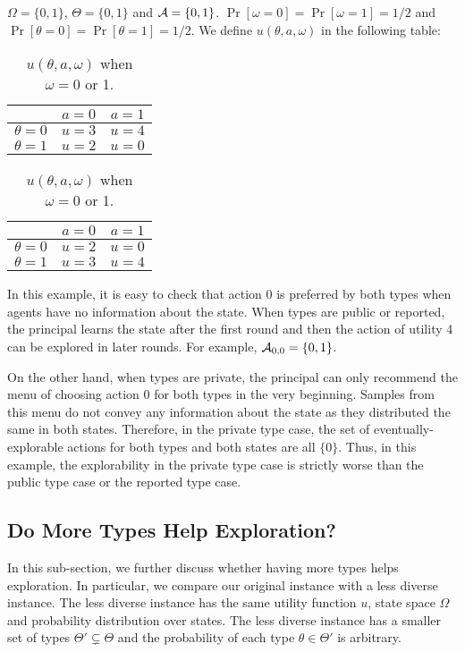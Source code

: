\begin{example}
\label{exp:simple}
$\varOmega = \{0,1\}$, $\varTheta = \{0,1\}$ and $\mathcal{A} =\{0,1\}$. $\Pr[\omega =0] =\Pr[\omega =1] = 1/2$ and $\Pr[\theta = 0] = \Pr[\theta=1] =1/2$. We define $u(\theta, a, \omega)$ in the following table:\\
\begin{table}[H]
\centering
\begin{tabular}{|c||c|c|}
\hline
&$a=0$&$a=1$\\
\hline
\hline
$\theta = 0$& $u = 3$ & $u =4$\\
\hline
$\theta = 1$& $u = 2$ & $u =0$\\
\hline
\end{tabular}
\quad
\begin{tabular}{|c||c|c|}
\hline
&$a=0$&$a=1$\\
\hline
\hline
$\theta = 0$& $u = 2$ & $u =0$\\
\hline
$\theta = 1$& $u = 3$ & $u =4$\\
\hline
\end{tabular}
\caption{$u(\theta,a,\omega)$ when $\omega =0 $ or 1.}
\end{table}

\end{example}
In this example, it is easy to check that action 0 is preferred by both types when agents have no information about the state. When types are public or reported, the principal learns the state after the first round and then the action of utility 4 can be explored in later rounds. For example, $\mathcal{A}_{0,0} = \{0,1\}$.   

On the other hand, when types are private, the principal can only recommend the menu of choosing action 0 for both types in the very beginning. Samples from this menu do not convey any information about the state as they distributed the same in both states. Therefore, in the private type case, the set of eventually-explorable actions for both types and both states are all $\{0\}$. Thus, in this example, the explorability in the private type case is strictly worse than the public type case or the reported type case.

\subsection{Do More Types Help Exploration?}
In this sub-section, we further discuss whether having more types helps exploration. In particular, we compare our original instance with a less diverse instance. The less diverse instance has the same utility function $u$, state space $\varOmega$ and probability distribution over states. The less diverse instance has a smaller set of types $\varTheta' \subsetneq \varTheta$ and the probability of each type $\theta \in \varTheta'$ is arbitrary. 

